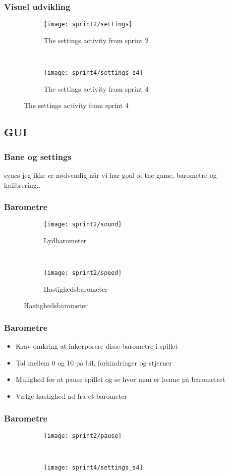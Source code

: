 \begin{frame}
\frametitle{Visuel udvikling}
\begin{figure}
\begin{subfigure}[b]{0.4\textwidth}
\texttt{[image: sprint2/settings]}
\caption{The settings activity from sprint 2}
\end{subfigure}
~
\begin{subfigure}[b]{0.4\textwidth}
\texttt{[image: sprint4/settings\_s4]}
\caption{The settings activity from sprint 4}
\end{subfigure}
\end{figure}
\end{frame}



\subsection{GUI}
\begin{frame}
\frametitle{Bane og settings}
synes jeg ikke er nødvendig når vi har goal of the game, barometre og kalibrering..
\end{frame}
\begin{frame}
\frametitle{Barometre}
\begin{figure}[h]
	\centering
        \begin{subfigure}[b]{0.4\textwidth}
                \texttt{[image: sprint2/sound]}
                \caption{Lydbarometer}
        \end{subfigure}%
        ~
        \begin{subfigure}[b]{0.4\textwidth}
                \texttt{[image: sprint2/speed]}
                \caption{Hastighedsbarometer}
        \end{subfigure}
\end{figure}
\end{frame}

\begin{frame}
\frametitle{Barometre}
\begin{itemize}
\item Krav omkring at inkorporere disse barometre i spillet
\item Tal mellem 0 og 10 på bil, forhindringer og stjerner
\item Mulighed for at pause spillet og se hvor man er henne på barometret
\item Vælge hastighed ud fra et barometer
\end{itemize}
\end{frame}

\begin{frame}
\frametitle{Barometre}
\begin{figure}
\begin{subfigure}[b]{0.4\textwidth}
\texttt{[image: sprint2/pause]}
\end{subfigure}
~
\begin{subfigure}[b]{0.4\textwidth}
\texttt{[image: sprint4/settings\_s4]}
\end{subfigure}
\end{figure}
\end{frame}